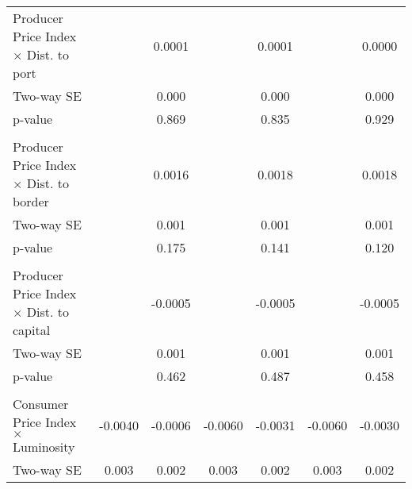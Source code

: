 {\begin{tabular}{l*{6}{c}}
\\ Producer Price Index $\times$ Dist. to port&                     &      0.0001         &                     &      0.0001         &                     &      0.0000         \\
\hspace{15pt} Two-way SE&                     &       0.000         &                     &       0.000         &                     &       0.000         \\
\hspace{25pt} p-value&                     &       0.869         &                     &       0.835         &                     &       0.929         \\
\\ Producer Price Index $\times$ Dist. to border&                     &      0.0016         &                     &      0.0018         &                     &      0.0018         \\
\hspace{15pt} Two-way SE&                     &       0.001         &                     &       0.001         &                     &       0.001         \\
\hspace{25pt} p-value&                     &       0.175         &                     &       0.141         &                     &       0.120         \\
\\ Producer Price Index $\times$ Dist. to capital&                     &     -0.0005         &                     &     -0.0005         &                     &     -0.0005         \\
\hspace{15pt} Two-way SE&                     &       0.001         &                     &       0.001         &                     &       0.001         \\
\hspace{25pt} p-value&                     &       0.462         &                     &       0.487         &                     &       0.458         \\
\\ Consumer Price Index $\times$ Luminosity&     -0.0040         &     -0.0006         &     -0.0060         &     -0.0031         &     -0.0060         &     -0.0030         \\
\hspace{15pt} Two-way SE&       0.003         &       0.002         &       0.003         &       0.002         &       0.003         &       0.002         \\

\end{tabular}}
